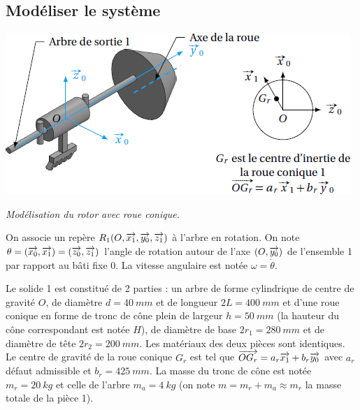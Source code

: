 \documentclass[10pt,fleqn]{article} %
\begin{document}
\begin{multicols}{2}
\section*{Modéliser le système\\}

%
%

\begin{center}
\includegraphics[width=\linewidth]{images/fig_02}

\textit{Modélisation du rotor avec roue conique.}
\end{center}

On associe un repère $R_1(O,\overrightarrow{x_1},\overrightarrow{y_0},\overrightarrow{z_1})$ à l'arbre en rotation. On note $\theta=(\overrightarrow{x_0},\overrightarrow{x_1})=(\overrightarrow{z_0},\overrightarrow{z_1})$ l'angle de rotation autour de l'axe $(O,\overrightarrow{y_0})$ de l'ensemble 1 par rapport au bâti fixe 0. La vitesse angulaire est notée $\omega=\dot{\theta}$. 

Le solide 1 est constitué de 2 parties : un arbre de forme cylindrique de centre de gravité $O$, de diamètre $d=\SI{40}{mm}$ et de longueur $2L=\SI{400}{mm}$ et d'une roue conique en forme de tronc de cône plein de largeur $h=\SI{50}{mm}$ (la hauteur du cône correspondant est notée $H$), de diamètre de base $2r_1=\SI{280}{mm}$ et de diamètre de tête $2r_2=\SI{200}{mm}$. Les matériaux des deux pièces sont identiques. Le centre de gravité de la roue conique $G_r$ est tel que $\overrightarrow{OG_r}=a_r \overrightarrow{x_1}+b_r\overrightarrow{y_0}$ avec $a_r$ défaut admissible et $b_r=\SI{425}{mm}$. La masse du tronc de cône est notée $m_r=\SI{20}{kg}$ et celle de l'arbre $m_a=\SI{4}{kg}$ (on note $m=m_r+m_a\approx m_r$ la masse totale de la pièce 1).




\end{multicols}
\end{document}
